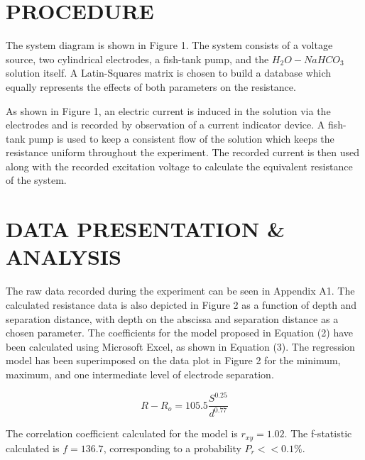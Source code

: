 \documentclass[12pt]{article}
\begin{document}
\section*{\fontsize{12}{12}\selectfont PROCEDURE}
The system diagram is shown in Figure 1. The system consists of a voltage source, two cylindrical electrodes, a fish-tank pump, and the $H_2O - NaHCO_3$ solution itself. A Latin-Squares matrix is chosen to build a database which equally represents the effects of both parameters on the resistance. 
\bigskip

As shown in Figure 1, an electric current is induced in the solution via the electrodes and is recorded by observation of a current indicator device. A fish-tank pump is used to keep a consistent flow of the solution which keeps the resistance uniform throughout the experiment. The recorded current is then used along with the recorded excitation voltage to calculate the equivalent resistance of the system.


\section*{\fontsize{12}{12}\selectfont DATA PRESENTATION \& ANALYSIS}
The raw data recorded during the experiment can be seen in Appendix A1. The calculated resistance data is also depicted in Figure 2 as a function of depth and separation distance, with depth on the abscissa and separation distance as a chosen parameter. The coefficients for the model proposed in Equation (2) have been calculated using Microsoft Excel, as shown in Equation (3). The regression model has been superimposed on the data plot in Figure 2 for the minimum, maximum, and one intermediate level of electrode separation.
\bigskip

\begin{equation}
R-R_o = 105.5\frac{S^{0.25}}{d^{0.77}}
\end{equation}

\bigskip

The correlation coefficient calculated for the model is $r_{xy}=1.02$. The f-statistic calculated is $f=136.7$, corresponding to a probability $P_r << 0.1\%.$
\end{document}
